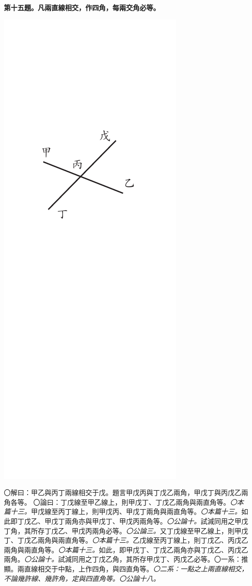 \documentclass[12pt,b5paper,landscape]{article}
\newcommand{\ccom}[1]{{\footnotesize \emph{〇#1}}}
\newcommand{\bcom}[1]{〇#1}
\newcommand{\cthm}[1]{{
\vspace{8pt}

\bfseries #1}}
\begin{document}
\begin{multicols}{2}
\cthm{第十五題。凡兩直線相交，作四角，每兩交角必等。}
\begin{center}
\includegraphics[angle=90]{eu60}
\end{center}
\bcom{解曰：甲乙與丙丁兩線相交于戊。題言甲戊丙與丁戊乙兩角，甲戊丁與丙戊乙兩角各等。}
\bcom{論曰：丁戊線至甲乙線上，則甲戊丁、丁戊乙兩角與兩直角等。\ccom{本篇十三。}甲戊線至丙丁線上，則甲戊丙、甲戊丁兩角與兩直角等。\ccom{本篇十三。}如此即丁戊乙、甲戊丁兩角亦與甲戊丁、甲戊丙兩角等。\ccom{公論十。}試減同用之甲戊丁角，其所存丁戊乙、甲戊丙兩角必等。\ccom{公論三。}又丁戊線至甲乙線上，則甲戊丁、丁戊乙兩角與兩直角等。\ccom{本篇十三。}乙戊線至丙丁線上，則丁戊乙、丙戊乙兩角與兩直角等。\ccom{本篇十三。}如此，即甲戊丁、丁戊乙兩角亦與丁戊乙、丙戊乙兩角。\ccom{公論十。}試減同用之丁戊乙角，其所存甲戊丁、丙戊乙必等。}\bcom{一系：推顯。兩直線相交于中點，上作四角，與四直角等。}\ccom{二系：一點之上兩直線相交，不論幾許線、幾許角，定與四直角等。\ccom{公論十八。}}


\end{multicols}
\end{document}
